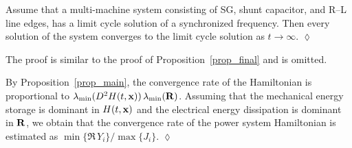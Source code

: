 \begin{proposition}
Assume that a multi-machine system consisting of SG, shunt capacitor, and R--L line edges, has a limit cycle solution of a synchronized frequency. Then every solution of the system converges to the limit cycle solution as $t \to \infty$. \hfill $\lozenge$
\end{proposition}

The proof is similar to the proof of Proposition~\ref{prop_final} and is omitted.

\begin{remark}
By Proposition~\ref{prop_main}, the convergence rate of the Hamiltonian is proportional to $\lambda_{\min}(D^2 H(t, \mathbf{x}))\, \lambda_{\min}(\mathbf{R})$. Assuming that the mechanical energy storage is dominant in $H(t, \mathbf{x})$ and the electrical energy dissipation is dominant in $\mathbf{R}$, we obtain that the convergence rate of the power system Hamiltonian is estimated as $\min\{\Re\, Y_i\}/\max\{J_i\}$. \hfill $\lozenge$
\end{remark}